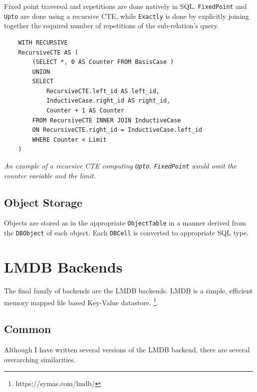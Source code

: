 \documentclass[12pt,a4paper,twoside,openright]{report}
\newcommand\codeName[1]{\texttt{#1}}
\newcommand\note[1]{\textit{#1}}
\renewcommand{\baselinestretch}{1.1}    %
\begin{document}
Fixed point traversal and repetitions are done natively in SQL. \codeName{FixedPoint} and \codeName{Upto} are done using a recursive CTE, while \codeName{Exactly} is done by explicitly joining together the required number of repetitions of the sub-relation's query.	

\renewcommand{\baselinestretch}{0.8}
	\begin{framed}
	\begin{verbatim}
	WITH RECURSIVE
    RecursiveCTE AS (
    	(SELECT *, 0 AS Counter FROM BasisCase )
    	UNION
    	SELECT 
    		RecursiveCTE.left_id AS left_id,
    		InductiveCase.right_id AS right_id,
    		Counter + 1 AS Counter
    	FROM RecursiveCTE INNER JOIN InductiveCase
    	ON RecursiveCTE.right_id = InductiveCase.left_id
    	WHERE Counter < Limit
    )
	\end{verbatim}
	\renewcommand{\baselinestretch}{1.1}
	\note{An example of a recursive CTE computing \codeName{Upto}. \codeName{FixedPoint} would omit the counter variable and the limit.}
	\end{framed}
	
	\subsection{Object Storage}
	Objects are stored as in the appropriate \codeName{ObjectTable} in a manner derived from the \codeName{DBObject} of each object. Each \codeName{DBCell} is converted to appropriate SQL type.

\section{LMDB Backends}
The final family of backends are the LMDB backends. LMDB is a simple, efficient memory mapped file based Key-Value datastore. \footnote{https://symas.com/lmdb/}.

	\subsection{Common}
	Although I have written several versions of the LMDB backend, there are several overarching similarities.
\end{document}
